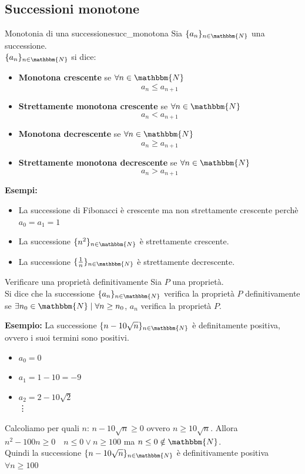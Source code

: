 \documentclass[12pt]{report}
\newcounter{definition}
\newcommand{\nmu}{}
\begin{document}
	\subsection{Successioni monotone}
	\begin{definition}{\nmu Monotonia di una successione}{succ_monotona}
		Sia $\{a_n\}_{n \in \mathbbm{N}}$ una successione. \\
		$\{a_n\}_{n \in \mathbbm{N}}$ si dice:
		\begin{itemize}
			\item \textbf{Monotona crescente} se $\forall n \in \mathbbm{N}$
			\[
			a_n \leq a_{n + 1}
			\]
			\item \textbf{Strettamente monotona crescente} se $\forall n \in \mathbbm{N}$
			\[
			a_n < a_{n + 1}
			\]
			\item \textbf{Monotona decrescente} se $\forall n \in \mathbbm{N}$
			\[
			a_n \geq a_{n + 1}
			\]
			\item \textbf{Strettamente monotona decrescente} se $\forall n \in \mathbbm{N}$
			\[
			a_n > a_{n + 1}
			\]
		\end{itemize}
	\end{definition}
	\textbf{Esempi:}
	\begin{itemize}
		\item La successione di Fibonacci è crescente ma non strettamente crescente perchè $a_0=a_1=1$
		\item La successione $\{n^2\}_{n \in \mathbbm{N}}$ è strettamente crescente.
		\item La successione $\{\frac{1}{n}\}_{n \in \mathbbm{N}}$ è strettamente decrescente.
	\end{itemize}
	\begin{definition}{\nmu Verificare una proprietà definitivamente}{}
		Sia $P$ una proprietà. \\
		Si dice che la successione $\{a_n\}_{n \in \mathbbm{N}}$ verifica la proprietà $P$ definitivamente se $\exists n_0 \in \mathbbm{N} \mid \forall n \geq n_0$, $a_n$ verifica la proprietà $P$.
	\end{definition}
	\textbf{Esempio:} La successione $\{n - 10\sqrt{n}\}_{n \in \mathbbm{N}}$ è definitamente positiva, ovvero i suoi termini sono positivi.
	\begin{itemize}
		\item $a_0 = 0$
		\item $a_1 = 1 - 10 = -9$
		\item $a_2 = 2 - 10\sqrt{2}$ \\
		\vdots
	\end{itemize}
	Calcoliamo per quali $n$: $n - 10\sqrt{n} \geq 0$ ovvero $n \geq 10\sqrt{n}$. Allora $n^2 - 100n \geq 0 \quad n \leq 0 \vee n \geq 100$ ma $n \leq 0 \notin \mathbbm{N}$. \\
	Quindi la successione $\{n - 10\sqrt{n}\}_{n \in \mathbbm{N}}$ è definitivamente positiva $\forall n \geq 100$
\end{document}
